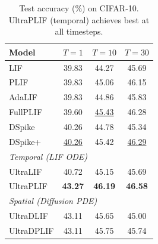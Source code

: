\documentclass{article}
\theoremstyle{plain}
\theoremstyle{definition}
\theoremstyle{remark}
\begin{document}
\begin{table}[t]
\caption{Test accuracy (\%) on CIFAR-10. UltraPLIF (temporal) achieves best at all timesteps.}
\label{tab:cifar10}
\vskip 0.1in
\begin{center}
\begin{small}
\begin{tabular}{lccc}
\toprule
Model & $T{=}1$ & $T{=}10$ & $T{=}30$ \\
\midrule
LIF        & 39.83 & 44.27 & 45.69 \\
PLIF       & 39.83 & 45.06 & 46.15 \\
AdaLIF     & 39.83 & 44.86 & 45.83 \\
FullPLIF   & 39.60 & \underline{45.43} & 46.28 \\
DSpike     & 40.26 & 44.78 & 45.34 \\
DSpike+    & \underline{40.26} & 45.42 & \underline{46.29} \\
\midrule
\multicolumn{4}{l}{\textit{Temporal (LIF ODE)}} \\
UltraLIF   & 40.72 & 45.15 & 45.69 \\
UltraPLIF  & \textbf{43.27} & \textbf{46.19} & \textbf{46.58} \\
\midrule
\multicolumn{4}{l}{\textit{Spatial (Diffusion PDE)}} \\
UltraDLIF  & 43.11 & 45.65 & 45.00 \\
UltraDPLIF & 43.11 & 45.75 & 45.74 \\
\bottomrule
\end{tabular}
\end{small}
\end{center}
\vskip -0.1in
\end{table}
\end{document}
